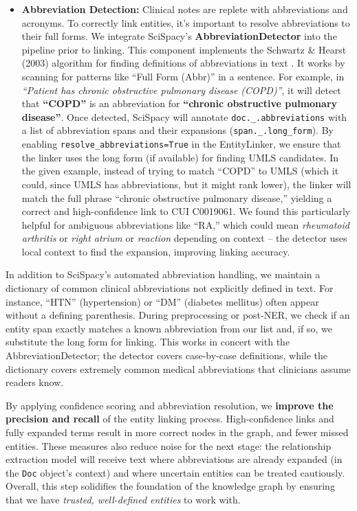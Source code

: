 \begin{itemize}
\item \textbf{Abbreviation Detection:} Clinical notes are replete with abbreviations and acronyms. To correctly link entities, it's important to resolve abbreviations to their full forms. We integrate SciSpacy's \textbf{AbbreviationDetector} into the pipeline prior to linking. This component implements the Schwartz \& Hearst (2003) algorithm for finding definitions of abbreviations in text \parencite{Schwartz2003}. It works by scanning for patterns like ``Full Form (Abbr)'' in a sentence. For example, in \textit{``Patient has chronic obstructive pulmonary disease (COPD)''}, it will detect that \textbf{``COPD''} is an abbreviation for \textbf{``chronic obstructive pulmonary disease''}. Once detected, SciSpacy will annotate \texttt{doc.\_.abbreviations} with a list of abbreviation spans and their expansions (\texttt{span.\_.long\_form}). By enabling \texttt{resolve\_abbreviations=True} in the EntityLinker, we ensure that the linker uses the long form (if available) for finding UMLS candidates. In the given example, instead of trying to match ``COPD'' to UMLS (which it could, since UMLS has abbreviations, but it might rank lower), the linker will match the full phrase ``chronic obstructive pulmonary disease,'' yielding a correct and high-confidence link to CUI C0019061. We found this particularly helpful for ambiguous abbreviations like ``RA,'' which could mean \textit{rheumatoid arthritis} or \textit{right atrium} or \textit{reaction} depending on context – the detector uses local context to find the expansion, improving linking accuracy.
\end{itemize}

In addition to SciSpacy's automated abbreviation handling, we maintain a dictionary of common clinical abbreviations not explicitly defined in text. For instance, ``HTN'' (hypertension) or ``DM'' (diabetes mellitus) often appear without a defining parenthesis. During preprocessing or post-NER, we check if an entity span exactly matches a known abbreviation from our list and, if so, we substitute the long form for linking. This works in concert with the AbbreviationDetector; the detector covers case-by-case definitions, while the dictionary covers extremely common medical abbreviations that clinicians assume readers know.

By applying confidence scoring and abbreviation resolution, we \textbf{improve the precision and recall} of the entity linking process. High-confidence links and fully expanded terms result in more correct nodes in the graph, and fewer missed entities. These measures also reduce noise for the next stage: the relationship extraction model will receive text where abbreviations are already expanded (in the \texttt{Doc} object's context) and where uncertain entities can be treated cautiously. Overall, this step solidifies the foundation of the knowledge graph by ensuring that we have \textit{trusted, well-defined entities} to work with.

